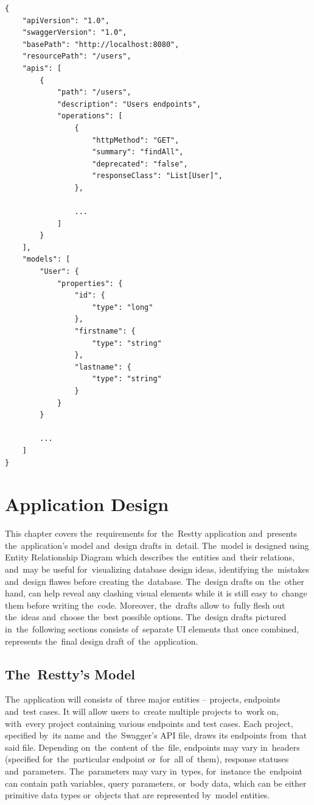 \vspace{1mm}
\begin{lstlisting}[caption=An~example of~API documentation in~JSON format
created using the~Swagger framework., style=dp-default, label=lst-swagger-json]
{
	"apiVersion": "1.0",
	"swaggerVersion": "1.0",
	"basePath": "http://localhost:8080",
	"resourcePath": "/users",
	"apis": [
		{
			"path": "/users",
			"description": "Users endpoints",
			"operations": [
				{
					"httpMethod": "GET",
					"summary": "findAll",
					"deprecated": "false",
					"responseClass": "List[User]", 
				},
				
				... 
			]
		}
	],
	"models": [
		"User": {
			"properties": {
				"id": {
					"type": "long"
				},
				"firstname": {
					"type": "string"
				},
				"lastname": {
					"type": "string"
				}
			}
		}
		
		...	
	]
}
\end{lstlisting}
  





\chapter{Application Design}
\label{Design}
This chapter covers the~requirements for~the~Restty application and~presents
the~application's model and~design drafts in~detail. The~model is designed using Entity Relationship Diagram
which describes the~entities and~their relations, and~may be useful for~visualizing database design ideas,
identifying the~mistakes and~design flawes before creating the~database.
The~design drafts on~the~other hand, can help reveal any clashing visual elements while it is still easy
to~change them before writing the~code. Moreover, the~drafts allow to~fully flesh out the~ideas
and~choose the~best possible options. The~design drafts pictured in~the~following sections consists of~separate
UI elements that once combined, represents the~final design draft of~the~application.

\section{The~Restty's Model}
The~application will consists of~three major entities -- projects, endpoints and~test cases. It will allow users
to~create multiple projects to~work on, with~every project containing various endpoints and test cases. Each project,
specified by~its name and~the~Swagger's API file, draws its endpoints from~that said file. Depending on~the~content
of~the~file, endpoints may vary in~headers (specified for~the~particular endpoint or~for~all of~them), response
statuses and~parameters. The~parameters may vary in~types, for~instance the~endpoint can contain path variables, query parameters,
or~body data, which can be either primitive data types or~objects that are represented by~model entities.

